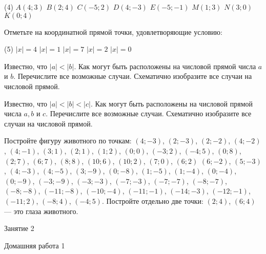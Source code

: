 \begin{class}[number=1-2]
\begin{listofex}[resume]
		\begin{tasks}(4)
			\task \( A(4;3) \)
			\task \( B(2;4) \)
			\task \( C(-5;2) \)
			\task \( D(4;-3) \)
			\task \( E(-5;-1) \)
			\task \( M(1;3) \)
			\task \( N(3;0) \)
			\task \( K(0;4) \)
		\end{tasks}
		\item Отметьте на координатной прямой точки, удовлетворяющие условию:
		\begin{tasks}(5)
			\task \( |x|=4 \)
			\task \( |x|=1 \)
			\task \( |x|=7 \)
			\task \( |x|=2 \)
			\task \( |x|=0 \)
		\end{tasks}
		\item Известно, что \( |a|<|b| \). Как могут быть расположены на числовой прямой числа \( a \) и \( b \). Перечислите все возможные случаи. Схематично изобразите все случаи на числовой прямой.
		\item Известно, что \( |a|<|b|<|c| \). Как могут быть расположены на числовой прямой числа \(a, b\) и \(c\). Перечислите все возможные случаи. Схематично изобразите все случаи на числовой прямой.
		\item Постройте фигуру животного по точкам: \( (4;-3) \), \( (2;-3) \), \( (2;-2) \), \( (4;-2) \), \( (4;-1) \), \( (3;1) \), \( (2;1) \), \( (1;2) \), \( (0;0) \), \( (-3;2) \), \( (-4;5) \), \( (0;8) \), \( (2;7) \), \( (6;7) \), \( (8;8) \), \( (10;6) \), \( (10;2) \), \( (7;0) \), \( (6;2) \) \( (6;-2) \), \( (5;-3) \), \( (4;-3) \), \( (4;-5) \), \( (3;-9) \), \( (0;-8) \), \( (1;-5) \), \( (1;-4) \), \( (0;-4) \), \( (0;-9) \), \( (-3;-9) \), \( (-3;-3) \), \( (-7;-3) \), \( (-7;-7) \),  \( (-8;-7) \), \( (-8;-8) \), \( (-11;-8) \), \( (-10;-4) \), \( (-11;-1) \), \( (-14;-3) \), \( (-12;-1) \), \( (-11;2) \), \( (-8;4) \), \( (-4;5) \). Постройте отдельно две точки: \( (2;4) \), \( (6;4) \) --- это глаза животного.
	\end{listofex}
\end{class}

\begin{class}[number=2]
	\begin{listofex}
		\item Занятие 2
	\end{listofex}
\end{class}

\begin{homework}[number=1]
	\begin{listofex}
		\item Домашняя работа 1
	\end{listofex}
\end{homework}

